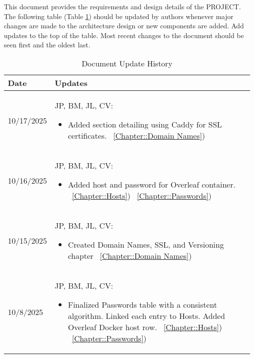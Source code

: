 This document provides the requirements and design details of the
PROJECT.  The following table (Table \ref{Table::UpdateHistory}) should be
updated by authors whenever major changes are made to the architecture
design or new components are added. Add updates to the top of the table.  
Most recent changes to the document should be seen first and the oldest 
last.


\begin{longtable}{|l||p{13.5cm}|}
\caption{Document Update History \label{Table::UpdateHistory}}\\
\hline
\textbf{Date} & \textbf{Updates} \\
\hline 
\endhead

10/17/2025 & JP, BM, JL, CV:
\begin{itemize}[topsep=0pt,itemsep=0pt,parsep=0pt,partopsep=0pt,leftmargin=12pt]
\item Added section detailing using Caddy for SSL certificates.
~\ref{Chapter::Domain Names})
\end{itemize} 
\\ \hline

10/16/2025 & JP, BM, JL, CV:
\begin{itemize}[topsep=0pt,itemsep=0pt,parsep=0pt,partopsep=0pt,leftmargin=12pt]
\item Added host and password for Overleaf container.
~\ref{Chapter::Hosts})
~\ref{Chapter::Passwords})
\end{itemize} 
\\ \hline

10/15/2025 & JP, BM, JL, CV:
\begin{itemize}[topsep=0pt,itemsep=0pt,parsep=0pt,partopsep=0pt,leftmargin=12pt]
\item Created Domain Names, SSL, and Versioning chapter
~\ref{Chapter::Domain Names})
\end{itemize} 
\\ \hline

10/8/2025 & JP, BM, JL, CV:
\begin{itemize}[topsep=0pt,itemsep=0pt,parsep=0pt,partopsep=0pt,leftmargin=12pt]
\item Finalized Passwords table with a consistent algorithm. Linked each entry to Hosts. Added Overleaf Docker host row.
~\ref{Chapter::Hosts})
~\ref{Chapter::Passwords})
\end{itemize} 
\\ \hline


\end{longtable}
